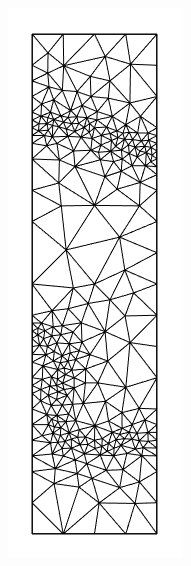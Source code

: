 \documentclass{article}
\begin{document}
\begin{figure}[H]
\begin{subfigure}[b]{0.15\linewidth}
    \caption{}
  \end{subfigure}
  \begin{subfigure}[b]{0.15\linewidth}
    \includegraphics[width=\linewidth]{Fig_submesh3.png}

\end{subfigure}
\end{figure}
\end{document}

